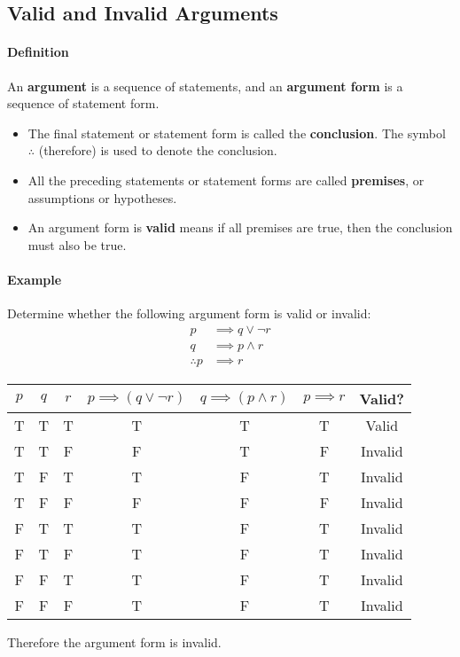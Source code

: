 \subsection{Valid and Invalid Arguments}
\hrulefill

\paragraph*{Definition}
An \textbf{argument} is a sequence of statements, and an \textbf{argument form} is a sequence of statement form.

\begin{itemize}
    \item The final statement or statement form is called the \textbf{conclusion}. The symbol $\therefore$ (therefore) is used to denote the conclusion.
    \item All the preceding statements or statement forms are called \textbf{premises}, or assumptions or hypotheses.
    \item An argument form is \textbf{valid} means if all premises are true, then the conclusion must also be true.
\end{itemize}

\paragraph*{Example}
Determine whether the following argument form is valid or invalid:
\begin{align*}
    p &\implies q \lor \neg r\\
    q &\implies p \land r\\
    \therefore p &\implies r
\end{align*}
\begin{center}
    \begin{tabular}{|c|c|c|c|c|c|c|}
        \hline
        $p$ & $q$ & $r$ & $p \implies (q \lor \neg r)$ & $q \implies (p \land r)$ & $p \implies r$ & Valid?\\
        \hline
        T & T & T & T & T & T & Valid\\
        T & T & F & F & T & F & Invalid\\
        T & F & T & T & F & T & Invalid\\
        T & F & F & F & F & F & Invalid\\
        F & T & T & T & F & T & Invalid\\
        F & T & F & T & F & T & Invalid\\
        F & F & T & T & F & T & Invalid\\
        F & F & F & T & F & T & Invalid\\
        \hline
    \end{tabular}
\end{center}
Therefore the argument form is invalid.

